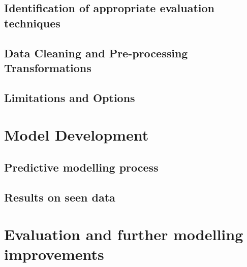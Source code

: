 \documentclass[12pt]{report}
\begin{document}
\section{Identification of appropriate evaluation techniques}

\section{Data Cleaning and Pre-processing Transformations}

\section{Limitations and Options}


\chapter{Model Development} %

\section{Predictive modelling process}

\section{Results on seen data}

\chapter{Evaluation and further modelling improvements}
\end{document}
